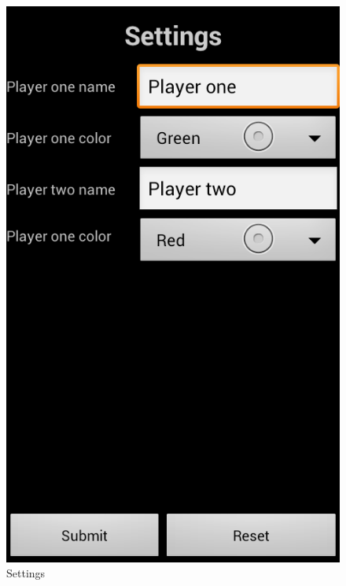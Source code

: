 \begin{figure}[ht]
\begin{minipage}[b]{0.325\linewidth}
		\centering
		\includegraphics[scale=0.225]{img/Screenshot_settings.png}
		\caption{Settings}
		\label{fig:settings}
	\end{minipage}
	\begin{minipage}[b]{0.325\linewidth}
		\centering

\end{minipage}
\end{figure}

